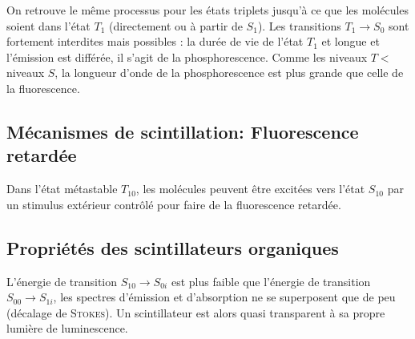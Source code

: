 On retrouve le même processus pour les états triplets jusqu'à ce que les molécules soient dans
l'état $T_1$ (directement ou à partir de $S_1$). Les transitions $T_1\to S_0$ sont fortement 
interdites mais possibles : la durée de vie de l'état $T_1$ et longue et l'émission est différée,
il s'agit de la phosphorescence. Comme les niveaux $T < $ niveaux $S$, la longueur d'onde de la
phosphorescence est plus grande que celle de la fluorescence.\\



\subsection{Mécanismes de scintillation: Fluorescence retardée}%
Dans l'état métastable $T_{10}$, les molécules peuvent être excitées vers l'état $S_{10}$ par 
un stimulus extérieur contrôlé pour faire de la fluorescence retardée.


\subsection{Propriétés des scintillateurs organiques}%
L'énergie de transition $S_{10}\to S_{0i}$ est plus faible que l'énergie de transition
$S_{00}\to S_{1i}$, les spectres d'émission et d'absorption ne se superposent que de peu
(décalage de \textsc{Stokes}). Un scintillateur est alors quasi transparent à sa propre
lumière de luminescence.


